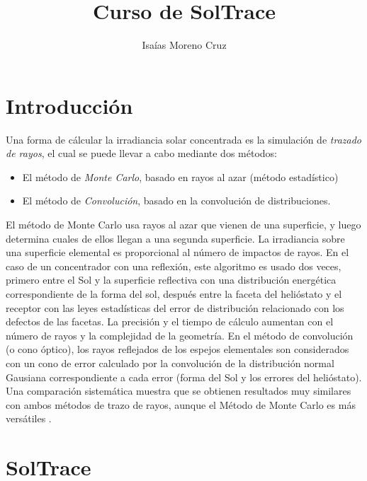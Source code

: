 \documentclass[12pt, spanish]{article}
\author{Isaías Moreno Cruz}
\title{Curso de SolTrace}
\theoremstyle{problemstyle}
\begin{document}
\maketitle


\section{Introducción}
\label{sec:rayos}

Una forma de cálcular la irradiancia solar concentrada es la simulación de \emph{trazado de rayos}, el cual se puede llevar a cabo mediante dos métodos:

\begin{itemize}[noitemsep]
  \item El método de \emph{Monte Carlo}, basado en rayos al azar (método estadístico)
  \item El método de \emph{Convolución}, basado en la convolución de distribuciones.
\end{itemize}

El método de Monte Carlo usa rayos al azar que vienen de una superficie, y luego determina cuales de ellos llegan a una segunda superficie. La irradiancia sobre una superficie elemental es proporcional al número de impactos de rayos. En el caso de un concentrador con una reflexión, este algoritmo es usado dos veces, primero entre el Sol y la superficie reflectiva con una distribución energética correspondiente de la forma del sol, después entre la faceta del helióstato y el receptor con las leyes estadísticas del error de distribución relacionado con los defectos de las facetas. La precisión y el tiempo de cálculo aumentan con el número de rayos y la complejidad de la geometría. En el método de convolución (o cono óptico), los rayos reflejados de los espejos elementales  son considerados con un cono de error calculado por la convolución de la distribución normal Gausiana correspondiente a cada error (forma del Sol y los errores del helióstato). Una comparación sistemática muestra que se obtienen resultados muy similares con ambos métodos de trazo de rayos, aunque el Método de Monte Carlo  es más versátiles \citep{Garcia2008codes}.


\section{SolTrace}
\label{sec:soltrace}
\end{document}
